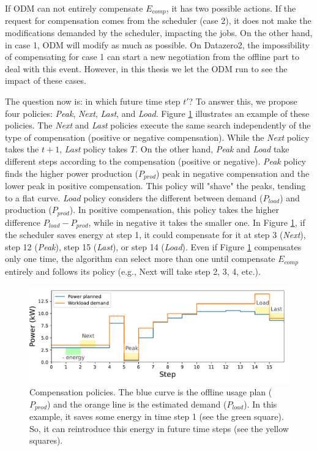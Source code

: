 If ODM can not entirely compensate $E_{comp}$, it has two possible actions. If the request for compensation comes from the scheduler (case 2), it does not make the modifications demanded by the scheduler, impacting the jobs. On the other hand, in case 1, ODM will modify as much as possible. On Datazero2, the impossibility of compensating for case 1 can start a new negotiation from the offline part to deal with this event. However, in this thesis we let the ODM run to see the impact of these cases.

The question now is: in which future time step $t'$? To answer this, we propose four policies: \emph{Peak}, \emph{Next}, \emph{Last}, and \emph{Load}. Figure \ref{fig:compensation} illustrates an example of these policies. The \emph{Next} and \emph{Last} policies execute the same search independently of the type of compensation (positive or negative compensation). While the \emph{Next} policy takes the $t + 1$, \emph{Last} policy takes $T$. On the other hand, \emph{Peak} and \emph{Load} take different steps according to the compensation (positive or negative). \emph{Peak} policy finds the higher power production ($P_{prod}$) peak in negative compensation and the lower peak in positive compensation. This policy will "shave" the peaks, tending to a flat curve. \emph{Load} policy considers the different between demand ($P_{load}$) and production ($P_{prod}$). In positive compensation, this policy takes the higher difference $P_{load} - P_{prod}$, while in negative it takes the smaller one. In Figure \ref{fig:compensation}, if the scheduler saves energy at step 1, it could compensate for it at step 3 (\emph{Next}), step 12 (\emph{Peak}), step 15 (\emph{Last}), or step 14 (\emph{Load}). Even if Figure \ref{fig:compensation} compensates only one time, the algorithm can select more than one until compensate $E_{comp}$ entirely and follows its policy (e.g., Next will take step 2, 3, 4, etc.).

\begin{figure}[!htb]
    \centering
    \includegraphics[scale=0.7]{Images/Compensations/policies.pdf}
    \caption{Compensation policies. The blue curve is the offline usage plan ($P_{prod}$) and the orange line is the estimated demand ($P_{load}$). In this example, it saves some energy in time step 1 (see the green square). So, it can reintroduce this energy in future time steps (see the yellow squares).}
    \label{fig:compensation}
\end{figure}


